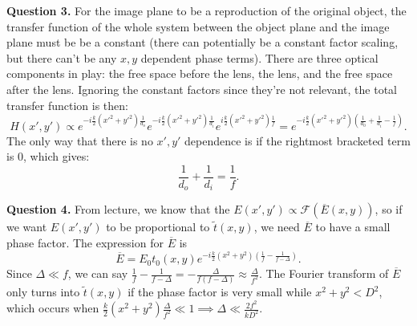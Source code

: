 \documentclass[letterpaper, reqno,11pt]{article}
\begin{document}
{\medskip\noindent\bf Question 3.} For the image plane to be a reproduction of the original object, the transfer function of the whole system between the object plane and the image plane must be be a constant (there can potentially be a constant factor scaling, but there can't be any $x,y$ dependent phase terms). There are three optical components in play: the free space before the lens, the lens, and the free space after the lens. Ignoring the constant factors since they're not relevant, the total transfer function is then:
\[
    H(x',y')\propto e^{-i \frac{k}{2}(x'^2+y'^2) \frac{1}{d_o}}e^{-i \frac{k}{2}(x'^2+y'^2) \frac{1}{d_i}}e^{i \frac{k}{2}(x'^2+y'^2) \frac{1}{f}}=e^{-i \frac{k}{2}(x'^2+y'^2)\left( \frac{1}{d_0}+\frac{1}{d_i}-\frac{1}{f} \right) }
.\]
The only way that there is no $x',y'$ dependence is if the rightmost bracketed term is 0, which gives:
\[
\frac{1}{d_o}+\frac{1}{d_i}=\frac{1}{f}
.\]

{\medskip\noindent\bf Question 4.} From lecture, we know that the $E(x',y')\propto \mathcal F(\overline{E}(x,y))$, so if we want $E(x',y')$ to be proportional to $\tilde t(x,y)$, we need $\overline{E}$ to have a small phase factor. The expression for $\overline{E}$ is
\[
\overline{E}=E_0 t_0(x,y) e^{-i \frac{k}{2}(x^2+y^2)\left( \frac{1}{f}-\frac{1}{f-\Delta} \right) }
.\]
Since $\Delta \ll f$, we can say $\frac{1}{f}-\frac{1}{f-\Delta}= -\frac{\Delta}{f(f-\Delta)}\approx \frac{\Delta}{f^2}$. The Fourier transform of $\overline{E}$ only turns into $\tilde t(x,y)$ if the phase factor is very small while $x^2+y^2<D^2$, which occurs when $\frac{k}{2}(x^2+y^2) \frac{\Delta}{f^2}\ll 1\implies \Delta \ll \frac{2f^2}{kD^2}$.
\end{document}
